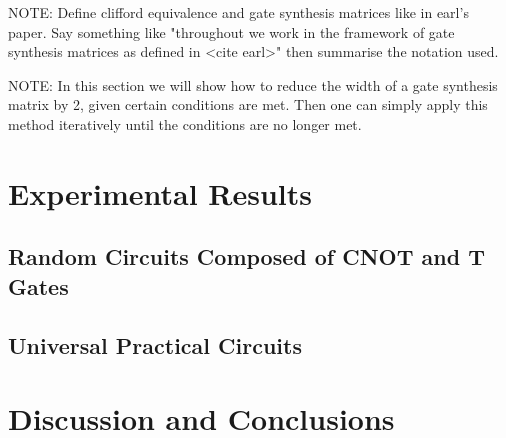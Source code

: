 \documentclass{article}
\theoremstyle{definition}
\theoremstyle{problem}
\theoremstyle{lemma}
\begin{document}
				NOTE: Define clifford equivalence and gate synthesis matrices like in earl's paper. Say something like "throughout we work in the framework of gate synthesis matrices as defined in <cite earl>" then summarise the notation used.
				
				NOTE: In this section we will show how to reduce the width of a gate synthesis matrix by 2, given certain conditions are met. Then one can simply apply this method iteratively until the conditions are no longer met.
			
			\section{Experimental Results}
			\label{s5_Results}
				\subsection{Random Circuits Composed of CNOT and T Gates}
				\subsection{Universal Practical Circuits}
			
			\section{Discussion and Conclusions}
			\label{s6_Discussion}
			
			
\end{document}
